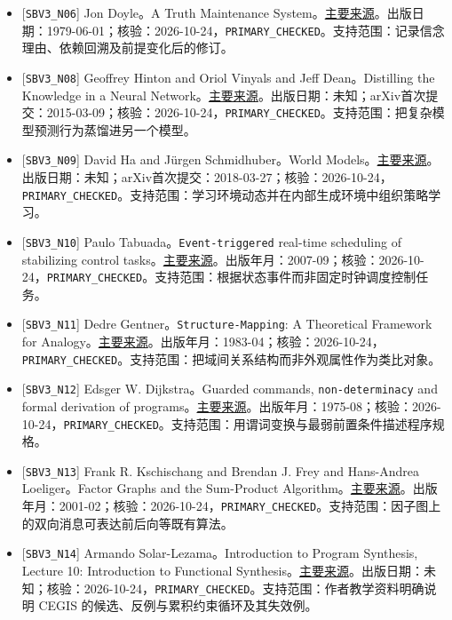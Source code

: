 \documentclass[
  10pt,
]{article}
\begin{document}
\begin{itemize}
\item
  {[}\nolinkurl{SBV3_N06}{]} Jon Doyle。A Truth Maintenance
  System。\href{https://dspace.mit.edu/entities/publication/5377b306-4ecc-4687-b1f5-78cbb4a0543a}{主要来源}。出版日期：1979-06-01；核验：2026-10-24，\nolinkurl{PRIMARY_CHECKED}。支持范围：记录信念理由、依赖回溯及前提变化后的修订。
\item
  {[}\nolinkurl{SBV3_N08}{]} Geoffrey Hinton and Oriol Vinyals and Jeff
  Dean。Distilling the Knowledge in a Neural
  Network。\href{https://arxiv.org/abs/1503.02531}{主要来源}。出版日期：未知；arXiv首次提交：2015-03-09；核验：2026-10-24，\nolinkurl{PRIMARY_CHECKED}。支持范围：把复杂模型预测行为蒸馏进另一个模型。
\item
  {[}\nolinkurl{SBV3_N09}{]} David Ha and Jürgen Schmidhuber。World
  Models。\href{https://arxiv.org/abs/1803.10122}{主要来源}。出版日期：未知；arXiv首次提交：2018-03-27；核验：2026-10-24，\nolinkurl{PRIMARY_CHECKED}。支持范围：学习环境动态并在内部生成环境中组织策略学习。
\item
  {[}\nolinkurl{SBV3_N10}{]} Paulo Tabuada。\nolinkurl{Event-triggered}
  real-time scheduling of stabilizing control
  tasks。\href{https://www.ee.ucla.edu/~tabuada/Papers/EventTriggered.pdf}{主要来源}。出版年月：2007-09；核验：2026-10-24，\nolinkurl{PRIMARY_CHECKED}。支持范围：根据状态事件而非固定时钟调度控制任务。
\item
  {[}\nolinkurl{SBV3_N11}{]} Dedre
  Gentner。\nolinkurl{Structure-Mapping}: A Theoretical Framework for
  Analogy。\href{https://groups.psych.northwestern.edu/gentner/papers/Gentner83.2b.pdf}{主要来源}。出版年月：1983-04；核验：2026-10-24，\nolinkurl{PRIMARY_CHECKED}。支持范围：把域间关系结构而非外观属性作为类比对象。
\item
  {[}\nolinkurl{SBV3_N12}{]} Edsger W. Dijkstra。Guarded commands,
  \nolinkurl{non-determinacy} and formal derivation of
  programs。\href{https://www.cs.utexas.edu/~EWD/transcriptions/EWD04xx/EWD472.html}{主要来源}。出版年月：1975-08；核验：2026-10-24，\nolinkurl{PRIMARY_CHECKED}。支持范围：用谓词变换与最弱前置条件描述程序规格。
\item
  {[}\nolinkurl{SBV3_N13}{]} Frank R. Kschischang and Brendan J. Frey
  and Hans-Andrea Loeliger。Factor Graphs and the Sum-Product
  Algorithm。\href{https://www.isiweb.ee.ethz.ch/papers/arch/aloe-2001-1.pdf}{主要来源}。出版年月：2001-02；核验：2026-10-24，\nolinkurl{PRIMARY_CHECKED}。支持范围：因子图上的双向消息可表达前后向等既有算法。
\item
  {[}\nolinkurl{SBV3_N14}{]} Armando Solar-Lezama。Introduction to
  Program Synthesis, Lecture 10: Introduction to Functional
  Synthesis。\href{https://people.csail.mit.edu/asolar/SynthesisCourse2020/Lecture10.htm}{主要来源}。出版日期：未知；核验：2026-10-24，\nolinkurl{PRIMARY_CHECKED}。支持范围：作者教学资料明确说明
  CEGIS 的候选、反例与累积约束循环及其失效例。
\end{itemize}
\end{document}
